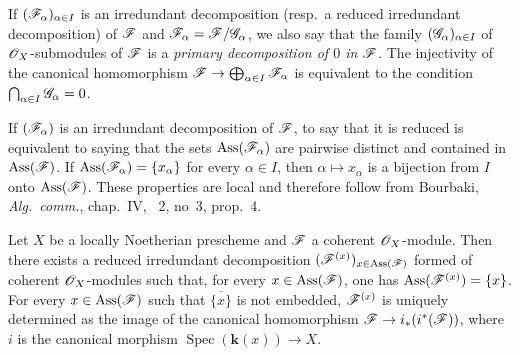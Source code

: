If $(\mathscr{F}_\alpha)_{\alpha\in I}$ is an irredundant decomposition (resp.\ a reduced irredundant decomposition) of $\mathscr{F}$ and $\mathscr{F}_\alpha=\mathscr{F}/\mathscr{G}_\alpha$, we also say that the family $(\mathscr{G}_\alpha)_{\alpha\in I}$ of $\mathscr{O}_X$-submodules of $\mathscr{F}$ is a \emph{primary decomposition of $0$ in $\mathscr{F}$}.  The injectivity of the canonical homomorphism $\mathscr{F}\to\bigoplus_{\alpha\in I}\mathscr{F}_\alpha$ is equivalent to the condition $\bigcap_{\alpha\in I}\mathscr{G}_\alpha=0$.

If $(\mathscr{F}_\alpha)$ is an irredundant decomposition of $\mathscr{F}$, to say that it is reduced is equivalent to saying that the sets $\operatorname{Ass}(\mathscr{F}_\alpha)$ are pairwise distinct and contained in $\operatorname{Ass}(\mathscr{F})$.  If $\operatorname{Ass}(\mathscr{F}_\alpha)=\{x_\alpha\}$ for every $\alpha\in I$, then $\alpha\mapsto x_\alpha$ is a bijection from $I$ onto $\operatorname{Ass}(\mathscr{F})$.  These properties are local and therefore follow from Bourbaki, \emph{Alg.\ comm.}, chap.~IV, \textsection~2, no~3, prop.~4.

\begin{proposition}[3.2.6]
\label{IV.3.2.6}
Let $X$ be a locally Noetherian prescheme and $\mathscr{F}$ a coherent $\mathscr{O}_X$-module.
Then there exists a reduced irredundant decomposition $(\mathscr{F}^{(x)})_{x\in\operatorname{Ass}(\mathscr{F})}$ formed of coherent $\mathscr{O}_X$-modules such that, for every $x\in\operatorname{Ass}(\mathscr{F})$, one has $\operatorname{Ass}(\mathscr{F}^{(x)})=\{x\}$.
For every $x\in\operatorname{Ass}(\mathscr{F})$ such that $\overline{\{x\}}$ is not embedded, $\mathscr{F}^{(x)}$ is uniquely determined as the image of the canonical homomorphism $\mathscr{F}\to i_*(i^*(\mathscr{F}))$, where $i$ is the canonical morphism $\operatorname{Spec}(\boldsymbol{k}(x))\to X$.
\end{proposition}


